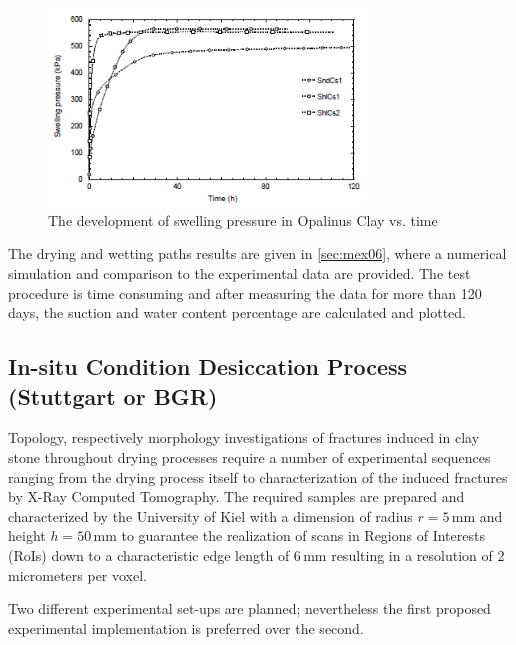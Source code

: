 \begin{figure}[!ht]
\centering
\includegraphics[width=0.75\textwidth]{figures/Amir_Shrinkage_Swelling_Pressure.png}
\caption{The development of swelling pressure in Opalinus Clay vs. time \cite{Peronetal2009}}
\label{fig:Amir_Shrinkage_Swelling_Pressure}
\end{figure}

The drying and wetting paths results are given in \ref{sec:mex06}, where a numerical simulation and comparison to the experimental data are provided. The test procedure is time consuming and after measuring the data for more than 120 days, the suction and water content percentage are calculated and plotted. 

\subsection{In-situ Condition Desiccation Process (Stuttgart or BGR)}
Topology, respectively morphology investigations of fractures induced in clay stone throughout drying processes require a number of experimental sequences ranging from the drying process itself to characterization of the induced fractures by X-Ray Computed Tomography. The required samples are prepared and characterized by the University of Kiel with a dimension of radius $r = 5 \, \text{mm}$ and height $h = 50 \, \text{mm}$ to guarantee the realization of scans in Regions of Interests (RoIs) down to a characteristic edge length of $6 \, \text{mm}$ resulting in a resolution of 2 micrometers per voxel.

Two different experimental set-ups are planned; nevertheless the first proposed experimental implementation is preferred over the second.


